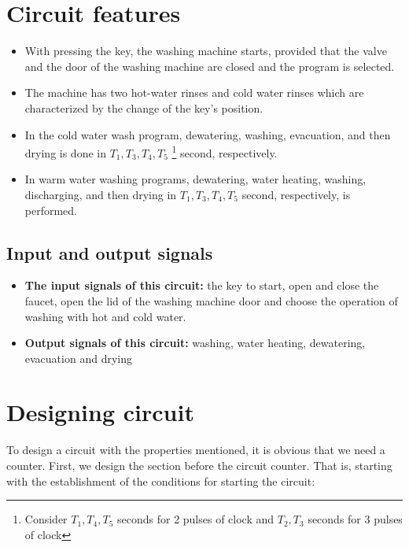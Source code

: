 \documentclass[12pt]{article}
\begin{document}
\section{Circuit features}
\label{sec:Circuit features}

\begin{itemize}
  \item  With pressing the key, the washing machine starts, provided that the valve and the door of the washing machine are closed and the program is selected.
  \item The machine has two hot-water rinses and cold water rinses which are characterized by the change of the key's position.
  \item  In the cold water wash program, dewatering, washing, evacuation, and then drying is done in $ T_1, T_3, T_4, T_5$  \footnote{\label{pulses note} Consider $T_1, T_4, T_5$  seconds for 2 pulses of clock and $T_2, T_3$  seconds for 3 pulses of clock}  second, respectively.
  \item In warm water washing programs, dewatering, water heating, washing, discharging, and then drying in $ T_1, T_3, T_4, T_5 $    second, respectively, is performed.

\end{itemize}

\subsection{Input and output signals}
\begin{itemize}
\item \textbf{The input signals of this circuit:} the key to start, open and close the faucet, open the lid of the washing machine door and choose the operation of washing with hot and cold water.
  \item \textbf{Output signals of this circuit:} washing, water heating, dewatering, evacuation and drying
\end{itemize}

\section{Designing circuit}
\label{sec:Designing circuit
}
To design a circuit with the properties mentioned, it is obvious that we need a counter. First, we design the section before the circuit counter. That is, starting with the establishment of the conditions for starting the circuit:
\end{document}
